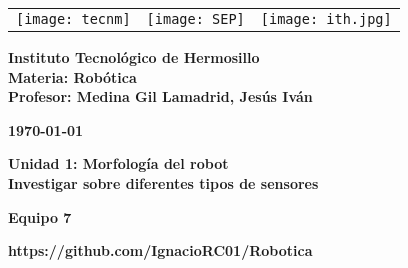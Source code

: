 \begin{titlepage}
	\centering
	\begin{tabular}{@{}p{} p{} p{}@{}}
		\texttt{[image: tecnm]} & 
		\centering \texttt{[image: SEP]} & 
		\raggedleft \texttt{[image: ith.jpg]} \\
	\end{tabular}
	
	\vspace{2em}
	
	\noindent
	\begin{minipage}[t]{0.48\textwidth}
		\raggedright
		\small \textbf{%
			Instituto Tecnológico de Hermosillo\\
			Materia: Robótica\\
			Profesor: Medina Gil Lamadrid, Jesús Iván%
		}
	\end{minipage}%
	\hfill
	\begin{minipage}[t]{0.48\textwidth}
		\raggedleft
		\small \textbf{\today}
	\end{minipage}
	
	\vspace{2em}
	
	{\large \textbf{Unidad 1: Morfología del robot}}\\
	{\Huge \textbf{Investigar sobre diferentes tipos de sensores}}
		
	\vspace{1em}
	
	\begin{center}
		{\Large \textbf{Equipo 7}}
		
	\textbf{https://github.com/IgnacioRC01/Robotica}
	\end{center}
	
	\vspace{1em}
	

\end{titlepage}
